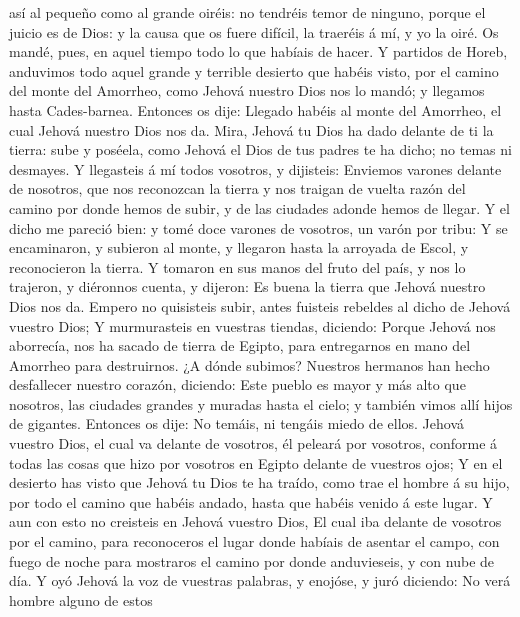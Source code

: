así al pequeño como al grande oiréis: no tendréis temor de ninguno,
porque el juicio es de Dios: y la causa que os fuere difícil, la
traeréis á mí, y yo la oiré.  Os mandé, pues, en aquel
tiempo todo lo que habíais de hacer.  Y partidos de Horeb,
anduvimos todo aquel grande y terrible desierto que habéis visto, por el
camino del monte del Amorrheo, como Jehová nuestro Dios nos lo mandó; y
llegamos hasta Cades-barnea.  Entonces os dije: Llegado
habéis al monte del Amorrheo, el cual Jehová nuestro Dios nos da.
 Mira, Jehová tu Dios ha dado delante de ti la tierra: sube
y poséela, como Jehová el Dios de tus padres te ha dicho; no temas ni
desmayes.  Y llegasteis á mí todos vosotros, y dijisteis:
Enviemos varones delante de nosotros, que nos reconozcan la tierra y nos
traigan de vuelta razón del camino por donde hemos de subir, y de las
ciudades adonde hemos de llegar.  Y el dicho me pareció
bien: y tomé doce varones de vosotros, un varón por tribu: 
Y se encaminaron, y subieron al monte, y llegaron hasta la arroyada de
Escol, y reconocieron la tierra.  Y tomaron en sus manos
del fruto del país, y nos lo trajeron, y diéronnos cuenta, y dijeron: Es
buena la tierra que Jehová nuestro Dios nos da.  Empero no
quisisteis subir, antes fuisteis rebeldes al dicho de Jehová vuestro
Dios;  Y murmurasteis en vuestras tiendas, diciendo: Porque
Jehová nos aborrecía, nos ha sacado de tierra de Egipto, para
entregarnos en mano del Amorrheo para destruirnos.  ¿A
dónde subimos? Nuestros hermanos han hecho desfallecer nuestro corazón,
diciendo: Este pueblo es mayor y más alto que nosotros, las ciudades
grandes y muradas hasta el cielo; y también vimos allí hijos de
gigantes.  Entonces os dije: No temáis, ni tengáis miedo de
ellos.  Jehová vuestro Dios, el cual va delante de
vosotros, él peleará por vosotros, conforme á todas las cosas que hizo
por vosotros en Egipto delante de vuestros ojos;  Y en el
desierto has visto que Jehová tu Dios te ha traído, como trae el hombre
á su hijo, por todo el camino que habéis andado, hasta que habéis venido
á este lugar.  Y aun con esto no creisteis en Jehová
vuestro Dios,  El cual iba delante de vosotros por el
camino, para reconoceros el lugar donde habíais de asentar el campo, con
fuego de noche para mostraros el camino por donde anduvieseis, y con
nube de día.  Y oyó Jehová la voz de vuestras palabras, y
enojóse, y juró diciendo:  No verá hombre alguno de estos
